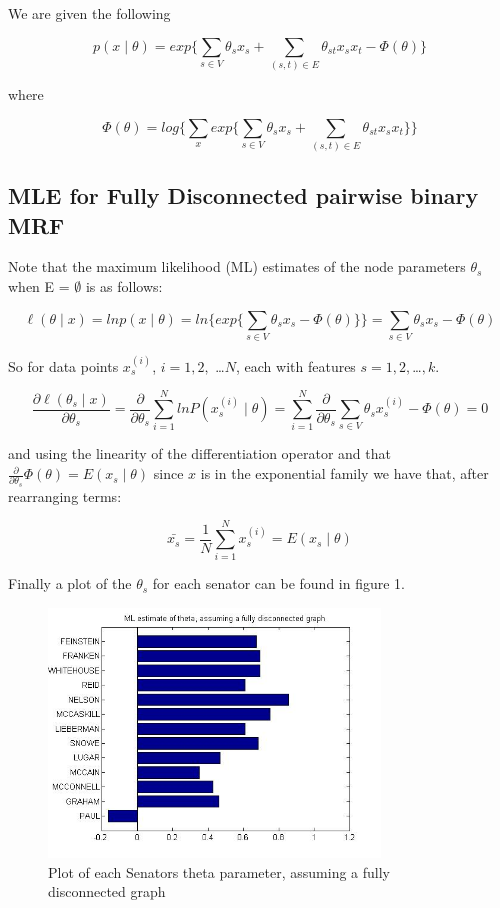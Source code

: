 \documentclass[]{article}
\begin{document}
We are given the following

\[p(x \mid \theta) = exp \biggl\{\sum_{s \in V}  \theta_{s}x_{s} + \sum_{(s,t) \in E} \theta_{st}x_{s}x_{t}-\Phi(\theta) \biggl\}\]

where

\[
\Phi(\theta) = log \biggl\{\sum_{x} exp \biggl\{\sum_{s \in V}  \theta_{s}x_{s} + \sum_{(s,t) \in E} \theta_{st}x_{s}x_{t} \biggl\} \biggl\}
\]

\subsection{MLE for Fully Disconnected pairwise binary
MRF}\label{mle-for-fully-disconnected-pairwise-binary-mrf}

Note that the maximum likelihood (ML) estimates of the node parameters
\(\theta_s\) when E = \(\emptyset\) is as follows:

\[
\ell(\theta \mid x) = ln p(x \mid \theta) = ln \biggl\{ exp \biggl\{\sum_{s \in V}  \theta_{s}x_{s} -\Phi(\theta) \biggl\} \biggl\} = \sum_{s \in V}  \theta_{s}x_{s} - \Phi(\theta)
\]

So for data points \(x_s^{(i)}\), \(i = 1, 2,\) \ldots{}\(N\), each with
features \(s = 1, 2,\)\ldots{}\(, k\).

\[  \frac{\partial \ell(\theta_s \mid x)}{\partial \theta_s} = \frac{\partial}{\partial \theta_s} \sum_{i=1}^{N} ln P(x_s^{(i)} \mid \theta) = \sum_{i=1}^{N} \frac{\partial}{\partial \theta_s}  \sum_{s \in V}  \theta_{s}x_{s}^{(i)} - \Phi(\theta) = 0\]

and using the linearity of the differentiation operator and that
\(\frac{\partial}{\partial \theta_s} \Phi(\theta) = E(x_s \mid \theta)\)
since \(x\) is in the exponential family we have that, after rearranging
terms:

\[
\bar{x_s} = \frac{1}{N} \sum_{i=1}^{N} x_{s}^{(i)} = E(x_s \mid \theta)
\]

Finally a plot of the \(\theta_s\) for each senator can be found in
figure 1.

\begin{figure}
\begin{center}
\includegraphics[width=250pt]{figures/fig1.jpg}
\caption{Plot of each Senators theta parameter, assuming a fully disconnected graph}
\end{center}
\end{figure}
\end{document}
